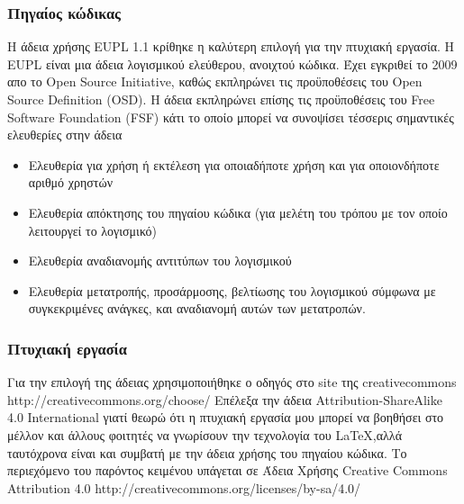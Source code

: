 \subsubsection{Πηγαίος κώδικας}
Η άδεια χρήσης EUPL 1.1 κρίθηκε η καλύτερη επιλογή για την πτυχιακή εργασία. Η EUPL είναι μια άδεια λογισμικού ελεύθερου, ανοιχτού κώδικα. Έχει εγκριθεί το 2009 απο το Open Source Initiative, καθώς εκπληρώνει τις προϋποθέσεις  του Open Source Definition (OSD)\cite{license-4}. Η άδεια εκπληρώνει επίσης τις προϋποθέσεις του Free Software Foundation (FSF) κάτι το οποίο μπορεί να συνοψίσει τέσσερις σημαντικές ελευθερίες στην άδεια
\begin{itemize}
\item Ελευθερία για χρήση ή εκτέλεση για οποιαδήποτε χρήση και για οποιονδήποτε αριθμό χρηστών
\item Ελευθερία απόκτησης του πηγαίου κώδικα (για μελέτη του τρόπου με τον οποίο λειτουργεί το λογισμικό)
\item Ελευθερία αναδιανομής αντιτύπων του λογισμικού
\item Ελευθερία μετατροπής, προσάρμοσης, βελτίωσης του λογισμικού σύμφωνα με συγκεκριμένες ανάγκες, και αναδιανομή αυτών των μετατροπών.
\end{itemize}

\subsubsection{Πτυχιακή εργασία}
Για την επιλογή της άδειας χρησιμοποιήθηκε ο οδηγός στο site της creativecommons http://creativecommons.org/choose/
Επέλεξα την άδεια Attribution-ShareAlike 4.0 International \ccbysa γιατί θεωρώ ότι η πτυχιακή εργασία μου μπορεί να βοηθήσει στο μέλλον και άλλους φοιτητές να γνωρίσουν την τεχνολογία του \LaTeX ,αλλά ταυτόχρονα είναι και συμβατή με την άδεια χρήσης του πηγαίου κώδικα.
\vfill
Το περιεχόμενο του παρόντος κειμένου υπάγεται σε Άδεια Χρήσης Creative Commons Attribution 4.0 http://creativecommons.org/licenses/by-sa/4.0/